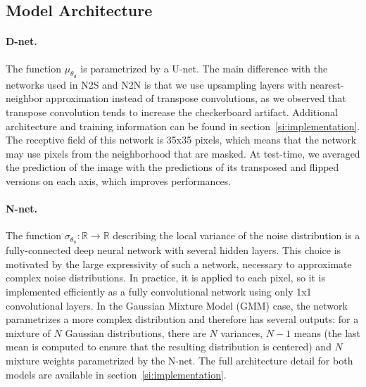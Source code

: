 \documentclass{article}
\begin{document}
\label{sec:experiments}
\subsection{Model Architecture}
\paragraph{D-net.}
The function $\mu_{\theta_d}$ is parametrized by a U-net. The main difference with the networks used in N2S and N2N is that we use upsampling layers with nearest-neighbor approximation instead of transpose convolutions, as we observed that transpose convolution tends to increase the checkerboard artifact.
Additional architecture and training information can be found in section~\ref{si:implementation}.
The receptive field of this network is 35x35 pixels, which means that the network may use pixels from the neighborhood that are masked.
At test-time, we averaged the prediction of the image with the predictions of its transposed and flipped versions on each axis, which improves performances.

\paragraph{N-net.}
The function $\sigma_{\theta_n}: \mathbb{R} \to \mathbb{R}$ describing the local variance of the noise distribution is a fully-connected deep neural network with several hidden layers. This choice is motivated by the large expressivity of such a network, necessary to approximate complex noise distributions. In practice, it is applied to each pixel, so it is implemented efficiently as a fully convolutional network using only 1x1 convolutional layers. In the Gaussian Mixture Model (GMM) case, the network parametrizes a more complex distribution and therefore has several outputs: for a mixture of $N$ Gaussian distributions, there are $N$ variances, $N-1$ means (the last mean is computed to ensure that the resulting distribution is centered) and $N$ mixture weights parametrized by the N-net. The full architecture detail for both models are available in section~\ref{si:implementation}.

\end{document}
